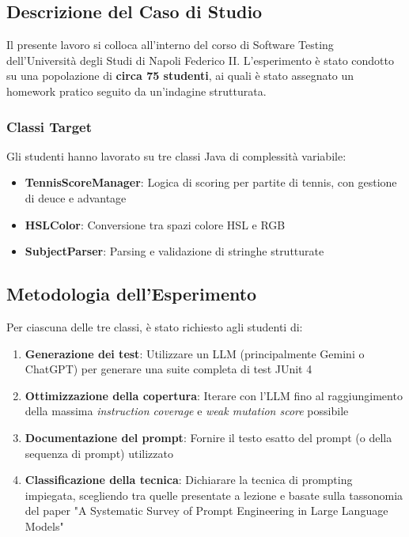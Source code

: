\documentclass[a4paper,12pt]{article}
\begin{document}
\subsection{Descrizione del Caso di Studio}
Il presente lavoro si colloca all'interno del corso di Software Testing dell'Università degli Studi di Napoli Federico II. L'esperimento è stato condotto su una popolazione di \textbf{circa 75 studenti}, ai quali è stato assegnato un homework pratico seguito da un'indagine strutturata.

\subsubsection{Classi Target}
Gli studenti hanno lavorato su tre classi Java di complessità variabile:
\begin{itemize}
    \item \textbf{TennisScoreManager}: Logica di scoring per partite di tennis, con gestione di deuce e advantage
    \item \textbf{HSLColor}: Conversione tra spazi colore HSL e RGB
    \item \textbf{SubjectParser}: Parsing e validazione di stringhe strutturate
\end{itemize}

\subsection{Metodologia dell'Esperimento}
Per ciascuna delle tre classi, è stato richiesto agli studenti di:

\begin{enumerate}
    \item \textbf{Generazione dei test}: Utilizzare un LLM (principalmente Gemini o ChatGPT) per generare una suite completa di test JUnit 4
    \item \textbf{Ottimizzazione della copertura}: Iterare con l'LLM fino al raggiungimento della massima \textit{instruction coverage} e \textit{weak mutation score} possibile
    \item \textbf{Documentazione del prompt}: Fornire il testo esatto del prompt (o della sequenza di prompt) utilizzato
    \item \textbf{Classificazione della tecnica}: Dichiarare la tecnica di prompting impiegata, scegliendo tra quelle presentate a lezione e basate sulla tassonomia del paper "A Systematic Survey of Prompt Engineering in Large Language Models"
\end{enumerate}
\end{document}
